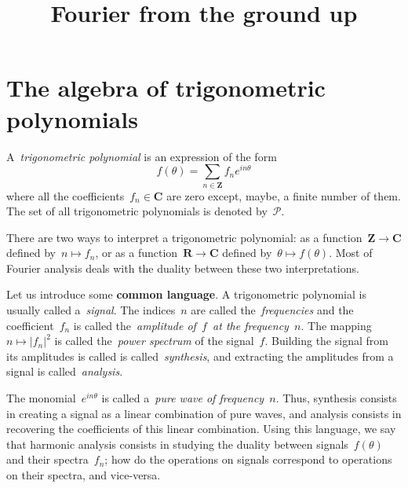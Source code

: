 \title{Fourier from the ground up}


\section{The algebra of trigonometric polynomials}


\newcommand{\Z}{\mathbf{Z}}
\newcommand{\Q}{\mathbf{Q}}
\newcommand{\R}{\mathbf{R}}
\newcommand{\C}{\mathbf{C}}
\newcommand{\PP}{\mathcal{P}}
\newcommand{\ud}{\mathrm{d}}
\newcommand{\ds}{\displaystyle}
\newcommand{\DFT}{\mathtt{DFT}}
\newcommand{\IDFT}{\mathtt{IDFT}}


\begin{definition}
A~\emph{trigonometric polynomial} is an expression of the form
$$
	f(\theta)=\sum_{n\in\Z} f_n e^{in\theta}
$$
where all the coefficients~$f_n\in\C$ are zero except, maybe, a finite
number of them.  The set of all trigonometric polynomials is denoted
by~$\PP$.
\end{definition}

There are two ways to interpret a trigonometric polynomial: as a
function~$\Z\to\C$ defined by~$n\mapsto f_n$, or as a function~$\R\to\C$
defined by~$\theta\mapsto f(\theta)$.
Most of Fourier analysis deals with
the duality between these two interpretations.

Let us introduce some {\bf common language}.
A trigonometric polynomial is usually called a~\emph{signal}.  The
indices~$n$ are called the~\emph{frequencies} and the coefficient~$f_n$
is called the~\emph{amplitude of~$f$~at the frequency~$n$}.  The
mapping~$n\mapsto\left|f_n\right|^2$ is called the~\emph{power
spectrum} of the signal~$f$.  Building the signal from its amplitudes
is called is called~\emph{synthesis}, and extracting the amplitudes
from a signal is called~\emph{analysis}.

The monomial~$e^{in\theta}$ is called a~\emph{pure wave of frequency~$n$}.
Thus, synthesis consists in creating a signal as a linear combination of pure
waves, and analysis consists in recovering the coefficients of this linear
combination.  Using this language, we say that harmonic analysis consists in
studying the duality between signals~$f(\theta)$ and their spectra~$f_n$; how
do the operations on signals correspond to operations on their spectra, and
vice-versa.


